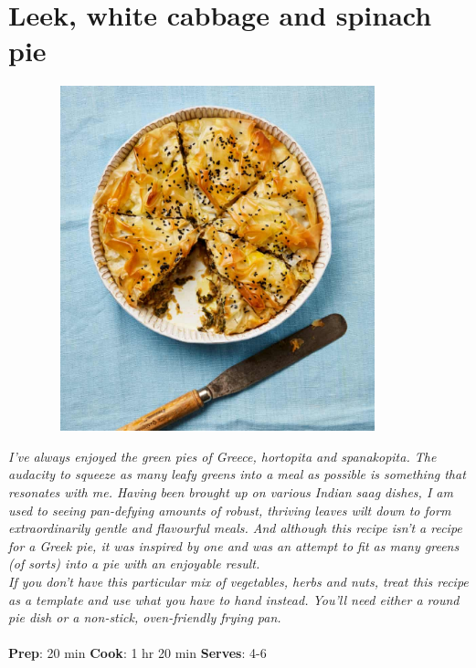 \documentclass{book}
\begin{document}
\section{Leek, white cabbage and spinach pie}
\begin{figure}
\centering\includegraphics[width=10cm,height=10cm,keepaspectratio]{Recipe_Pictures/Leek,_white_cabbage_and_spinach_pie.png}
\end{figure}
\emph{I’ve always enjoyed the green pies of Greece, hortopita and spanakopita. The audacity to squeeze as many leafy greens into a meal as possible is something that resonates with me. Having been brought up on various Indian saag dishes, I am used to seeing pan-defying amounts of robust, thriving leaves wilt down to form extraordinarily gentle and flavourful meals. And although this recipe isn’t a recipe for a Greek pie, it was inspired by one and was an attempt to fit as many greens (of sorts) into a pie with an enjoyable result.\\ 
If you don’t have this particular mix of vegetables, herbs and nuts, treat this recipe as a template and use what you have to hand instead. You’ll need either a round pie dish or a non-stick, oven-friendly frying pan.}\\\\ 
\textbf{Prep}: 20 min
\textbf{Cook}: 1 hr 20 min
\textbf{Serves}: 4-6
\end{document}
